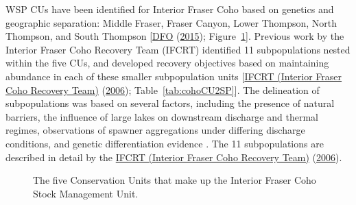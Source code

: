 \documentclass[11pt]{book}
\begin{document}
WSP CUs have been identified for Interior Fraser Coho based on genetics and geographic separation: Middle Fraser, Fraser Canyon, Lower Thompson, North Thompson, and South Thompson {[}\protect\hyperlink{ref-dfoWildSalmonPolicy2015}{DFO} (\protect\hyperlink{ref-dfoWildSalmonPolicy2015}{2015}); Figure~\ref{fig:coho-map}{]}. Previous work by the Interior Fraser Coho Recovery Team (IFCRT) identified 11 subpopulations nested within the five CUs, and developed recovery objectives based on maintaining abundance in each of these smaller subpopulation units {[}\protect\hyperlink{ref-ifcrtinteriorfrasercohorecoveryteamConservationStrategyCoho2006}{IFCRT (Interior Fraser Coho Recovery Team)} (\protect\hyperlink{ref-ifcrtinteriorfrasercohorecoveryteamConservationStrategyCoho2006}{2006}); Table~\ref{tab:cohoCU2SP}{]}. The delineation of subpopulations was based on several factors, including the presence of natural barriers, the influence of large lakes on downstream discharge and thermal regimes, observations of spawner aggregations under differing discharge conditions, and genetic differentiation evidence . The 11 subpopulations are described in detail by the \protect\hyperlink{ref-ifcrtinteriorfrasercohorecoveryteamConservationStrategyCoho2006}{IFCRT (Interior Fraser Coho Recovery Team)} (\protect\hyperlink{ref-ifcrtinteriorfrasercohorecoveryteamConservationStrategyCoho2006}{2006}).
\begin{figure}[htb]

{\centering {} 

}

\caption{The five Conservation Units that make up the Interior Fraser Coho Stock Management Unit.}\label{fig:coho-map}
\end{figure}
\end{document}
